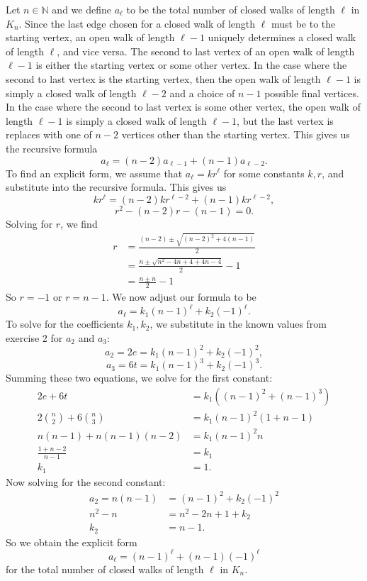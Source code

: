 \documentclass[12pt]{article}
\newcommand{\N}{\mathbb{N}}
\begin{document}
Let $n\in\N$ and we define $a_\ell$ to be the total number of closed walks of length $\ell$ in $K_n$. Since the last edge chosen for a closed walk of length $\ell$ must be to the starting vertex, an open walk of length $\ell-1$ uniquely determines a closed walk of length $\ell$, and vice versa. The second to last vertex of an open walk of length $\ell-1$ is either the starting vertex or some other vertex. In the case where the second to last vertex is the starting vertex, then the open walk of length $\ell-1$ is simply a closed walk of length $\ell-2$ and a choice of $n-1$ possible final vertices. In the case where the second to last vertex is some other vertex, the open walk of length $\ell-1$ is simply a closed walk of length $\ell-1$, but the last vertex is replaces with one of $n-2$ vertices other than the starting vertex. This gives us the recursive formula
\[a_\ell = (n-2)a_{\ell-1} + (n-1)a_{\ell-2}.\]
To find an explicit form, we assume that $a_\ell=kr^\ell$ for some constants $k,r$, and substitute into the recursive formula. This gives us
\[kr^\ell = (n-2)kr^{\ell-2} + (n-1)kr^{\ell-2},\]
\[r^2 - (n-2)r - (n-1) = 0.\]
Solving for $r$, we find
\begin{align*}
    r   &= \frac{(n-2)\pm\sqrt{(n-2)^2+4(n-1)}}{2} \\
        &= \frac{n\pm\sqrt{n^2-4n+4+4n-4}}{2} - 1 \\
        &= \frac{n\pm n}{2} - 1
\end{align*}
So $r=-1$ or $r=n-1$. We now adjust our formula to be
\[a_\ell = k_1(n-1)^\ell + k_2(-1)^\ell.\]
To solve for the coefficients $k_1,k_2$, we substitute in the known values from exercise 2 for $a_2$ and $a_3$:
\[a_2 = 2e = k_1(n-1)^2 + k_2(-1)^2,\]
\[a_3 = 6t = k_1(n-1)^3 + k_2(-1)^3.\]
Summing these two equations, we solve for the first constant:
\begin{align*}
    2e + 6t &= k_1((n-1)^2 + (n-1)^3) \\
    2{n \choose 2} + 6{n\choose 3} &= k_1(n-1)^2(1 + n-1) \\
    n(n-1) + n(n-1)(n-2) &= k_1(n-1)^2n \\
    \frac{1 + n-2}{n-1} &= k_1 \\
    k_1 &= 1.
\end{align*}
Now solving for the second constant:
\begin{align*}
    a_2 = n(n-1) &= (n-1)^2 + k_2(-1)^2 \\
    n^2 - n &= n^2 -2n + 1 + k_2 \\
    k_2 &= n-1.
\end{align*}
So we obtain the explicit form
\[a_\ell = (n-1)^\ell + (n-1)(-1)^\ell\]
for the total number of closed walks of length $\ell$ in $K_n$.
\end{document}
